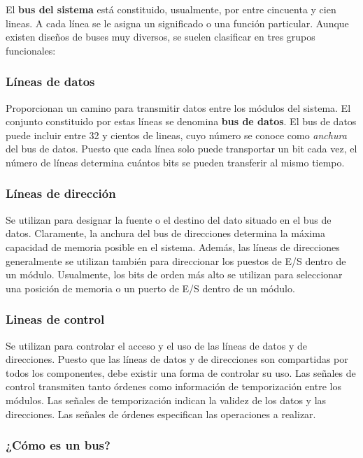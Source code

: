 El \textbf{bus del sistema} está constituido, usualmente, por entre cincuenta y cien lineas. A cada línea se le asigna un significado o una función particular. Aunque existen diseños de buses muy diversos, se suelen clasificar en tres grupos funcionales:

\subsubsection*{Líneas de datos} 

Proporcionan un camino para transmitir  datos entre los módulos del sistema. El conjunto constituido por estas líneas se denomina \textbf{bus de datos}. El bus de datos puede incluir entre 32 y cientos de lineas, cuyo número se conoce como \textit{anchura} del bus de datos. Puesto que cada línea solo puede transportar un bit cada vez, el número de líneas determina cuántos bits se pueden transferir al mismo tiempo.

\subsubsection*{Líneas de dirección}

Se utilizan para designar la fuente o el destino del dato situado en el bus de datos. Claramente, la anchura del bus de direcciones determina la máxima capacidad de memoria posible en el sistema. Además, las líneas de direcciones generalmente se utilizan también para direccionar los puestos de E/S dentro de un módulo. Usualmente, los bits de orden más alto se utilizan para seleccionar una posición de memoria o un puerto de E/S dentro de un módulo.

\subsubsection*{Lineas de control}

Se utilizan para controlar el acceso y el uso de las líneas de datos y de direcciones. Puesto que las líneas de datos y de direcciones son compartidas por todos los componentes, debe existir una forma de controlar su uso. Las señales de control transmiten tanto órdenes como información de temporización entre los módulos. Las señales de temporización indican la validez de los datos y las direcciones. Las señales de órdenes especifican las operaciones a realizar.

\subsubsection{¿Cómo es un bus?}

